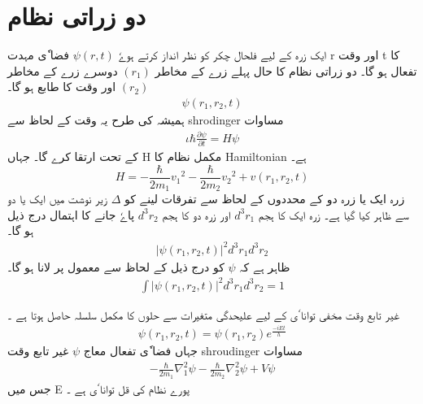 
\section{ دو   زراتی نظام} 

ایک زرہ کے لیے فلحال چکر کو نظر انداز کرتے ہوےٗ  
$ \psi ( r , t ) $
فضا ٗی مہدت r اور وقت t کا تفعال ہو گا۔ دو زراتی نظام کا حال پہلے زرے کے مخاطر 
$ ( r_1 ) $
دوسرے زرے کے مخاطر 
$ ( r_2 ) $
اور وقت کا طابع ہو گا۔ 
\begin{align}   
\psi ( r_1 , r_2 , t ) 
\end{align}
 ہمیشہ کی طرح یہ وقت کے لحاظ سے shrodinger مساوات 
\begin{align}
\iota \hbar \frac{ \partial \psi }{ \partial t } = H \psi
\end{align}
کے تحت ارتقا کرے گا۔ جہاں H مکمل  نظام کا Hamiltonian  ہے۔
\begin{equation}
H = - \frac{ \hbar }{ 2 m_1 } {v_1}^2  -  \frac{ \hbar }{ 2 m_2 } { v_2 }^2 +  v( r_1 , r_2 , t )
\end{equation}
زرہ ایک یا زرہ دو کے محددوں کے لحاظ سے  تفرقات لینے کو 
$ \Delta $
زیر نوشت میں ایک یا دو سے ظاہر کیا گیا ہے۔ زرہ ایک کا ہجم 
$ d^3 r_1 $
اور زرہ دو کا ہجم
$ d^3 r_2 $
پاےٗ جانے کا اہتمال درج ذیل ہو گا۔ 
\begin{align}
| \psi ( r_1 , r_2 , t ) |^2 { d^3 } { r_1 }  { d^3 } { r_2 }
\end{align}
ظاہر ہے کہ 
$ \psi $
کو درج ذیل کے لحاظ سے معمول پر لانا ہو گا۔ 
\begin{align}
\int | \psi ( r_1 , r_2 , t ) |^2 { d^3 } { r_1 } { d^3 } { r_2 } = 1
\end{align}

\newpage

غیر تابع وقت مخفی توانا ٗی کے لیے علیحدگی  متغیرات  سے حلوں کا مکمل سلسلہ حاصل ہوتا ہے ۔ 
\begin{align}
\psi ( r_1 , r_2 , t ) =  \psi ( r_1 , r_2 ) {e}^\frac{ - i E t }{h}  
\end{align}
جہاں فضا ٗی تفعال معاج 
$ \psi $
غیر تابع وقت shroudinger مساوات 
\begin{align}
-\frac{ \hbar }{ 2 m_1 }  {\nabla_1^2} { \psi } - \frac{ \hbar }{ 2 m_2 } \nabla_2^2 { \psi } + V \psi 
\end{align}
جس میں E پورے نظام کی قل توانا ٗی ہے ۔ 

